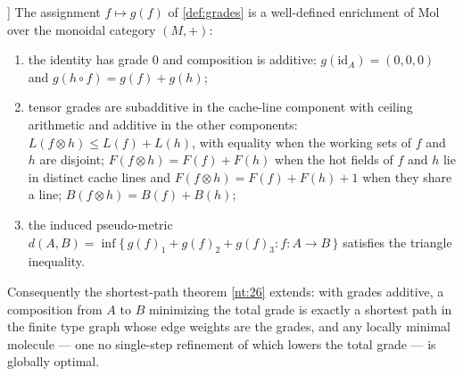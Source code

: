 \begin{theorem}[Resource-graded cost enrichment, NT53 [N]]\label{nt:53}
The assignment $f \mapsto g(f)$ of \autoref{def:grades} is a
well-defined enrichment of Mol over the monoidal category $(M, +)$:
\begin{enumerate}
\item[(i)] the identity has grade $0$ and composition is additive:
$g(\mathrm{id}_A) = (0,0,0)$ and $g(h \circ f) = g(f) + g(h)$;
\item[(ii)] tensor grades are subadditive in the cache-line component
with ceiling arithmetic and additive in the other components:
$L(f \otimes h) \le L(f) + L(h)$, with equality when the working sets of
$f$ and $h$ are disjoint; $F(f \otimes h) = F(f) + F(h)$ when the hot
fields of $f$ and $h$ lie in distinct cache lines and
$F(f \otimes h) = F(f) + F(h) + 1$ when they share a line;
$B(f \otimes h) = B(f) + B(h)$;
\item[(iii)] the induced pseudo-metric $d(A,B) = \inf\{\, g(f)_1 +
g(f)_2 + g(f)_3 : f \colon A \to B \,\}$ satisfies the triangle
inequality.
\end{enumerate}
Consequently the shortest-path theorem \ref{nt:26} extends: with grades
additive, a composition from $A$ to $B$ minimizing the total grade is
exactly a shortest path in the finite type graph whose edge weights are
the grades, and any locally minimal molecule --- one no single-step
refinement of which lowers the total grade --- is globally optimal.
\end{theorem}

